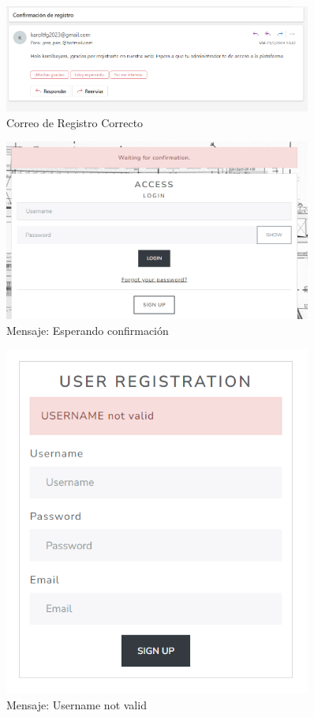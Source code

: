 \documentclass[a4paper, 12pt]{book}
\begin{document}
  \begin{figure}
    \centering
    \includegraphics[width=0.9\textwidth]{img/correoresgistro.png}
    \caption{Correo de Registro Correcto}
    \label{fig:registrook}
  \end{figure}
  \begin{figure}
    \centering
    \includegraphics[width=0.9\textwidth]{img/confacceso.png}
    \caption{Mensaje: Esperando confirmación}
    \label{fig:waiting}
  \end{figure}

  \begin{figure}
    \centering
    \includegraphics[width=0.9\textwidth]{img/username.png}
    \caption{Mensaje: Username not valid}
    \label{fig:usernameerror}
  \end{figure}
\end{document}
